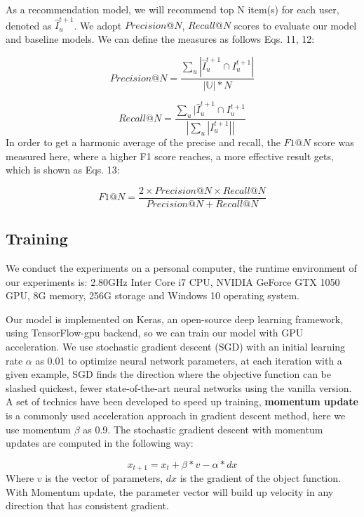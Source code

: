 \documentclass[runningheads]{llncs}
\begin{document}
As a recommendation model, we will recommend top N item(s) for each user, denoted as $\hat{I}_{u}^{t+1}$. We adopt $Precision@N$, $Recall@N$ scores to evaluate our model and baseline models. We can define the measures as follows Eqs. 11, 12:

\begin{equation}
Precision@N=\frac{\sum_{u}|\hat{I}_{u}^{t+1}\cap I_{u}^{t+1} |}{\left | \mathbb{U} \right |*N}
\end{equation}

\begin{equation}
Recall@N=\frac{\sum_{u}|\hat{I}_{u}^{t+1}\cap I_{u}^{t+1} }{\left |\sum_{u}|I_{u}^{t+1}| \right |}
\end{equation}
In order to get a harmonic average of the precise and recall, the $F1@N$ score was measured here, where a higher F1 score reaches, a more effective result gets, which is shown as Eqs. 13:

\begin{equation}
F1@N=\frac{2\times Precision@N\times Recall@N}{Precision@N+Recall@N}
\end{equation}
\subsection{Training}

We conduct the experiments on a personal computer, the runtime environment of our experiments is: 2.80GHz Inter Core i7 CPU, NVIDIA GeForce GTX 1050 GPU, 8G memory, 256G storage and Windows 10 operating system.

Our model is implemented on Keras, an open-source deep learning framework, using TensorFlow-gpu backend, so we can train our model with GPU acceleration. We use stochastic gradient descent (SGD) \cite{22} with an initial learning rate $\alpha$ as 0.01 to optimize neural network parameters, at each iteration with a given example, SGD finds the direction where the objective function can be slashed quickest, fewer state-of-the-art neural networks using the vanilla version. A set of technics have been developed to speed up training, \textbf{momentum update} \cite{22} is a commonly used acceleration approach in gradient descent method, here we use momentum $\beta $ as 0.9. The stochastic gradient descent with momentum updates are computed in the following way:

\begin{equation}
x_{t+1} = x_{t} + \beta \ast v -\alpha \ast dx
\end{equation}
Where $v$ is the vector of parameters, $dx$ is the gradient of the object function. With Momentum update, the parameter vector will build up velocity in any direction that has consistent gradient.
\end{document}
